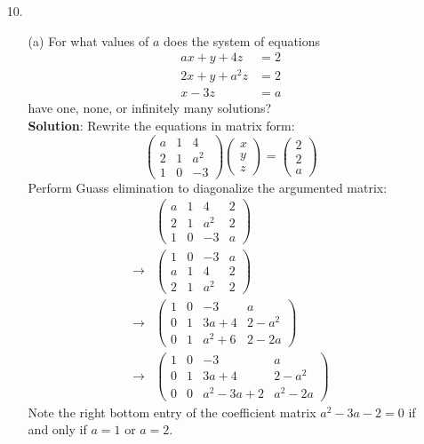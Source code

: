 \documentclass{article}
\begin{document}
\begin{enumerate}
    \item[10. ] 
        \begin{enumerate}
            \item[(a)] For what values of $a$ does the system of equations
                        \begin{align*}
                            ax + y + 4z &= 2 \\
                            2x + y + a^2z &= 2 \\
                            x - 3z &= a
                        \end{align*}
                        have one, none, or infinitely many solutions? \\
                
                \textbf{Solution}: Rewrite the equations in matrix form:
                $$\begin{pmatrix}a &1 &4\\2 &1 &a^2\\1 &0 &-3\end{pmatrix}\begin{pmatrix}x\\y\\z\end{pmatrix}=\begin{pmatrix}2\\2\\a\end{pmatrix}$$
                Perform Guass elimination to diagonalize the argumented matrix:
                \begin{align*}
                                & \left( \begin{array}{ccc|c} a &1 &4 &2\\2 &1 &a^2 &2\\1 &0 &-3 &a \end{array} \right) \\
                    \rightarrow & \left( \begin{array}{ccc|c} 1 &0 &-3 &a\\a &1 &4 &2\\2 &1 &a^2 &2 \end{array} \right) \\
                    \rightarrow & \left( \begin{array}{ccc|c} 1 &0 &-3 &a\\0 &1 &3a+4 &2-a^2\\0 &1 &a^2+6 &2-2a \end{array} \right) \\
                    \rightarrow & \left( \begin{array}{ccc|c} 1 &0 &-3 &a\\0 &1 &3a+4 &2-a^2\\0 &0 &a^2-3a+2 &a^2-2a \end{array} \right) 
                \end{align*}
                Note the right bottom entry of the coefficient matrix $a^2-3a-2=0$ if and only if $a=1$ or $a=2$.\\
                

\end{enumerate}
\end{enumerate}
\end{document}
